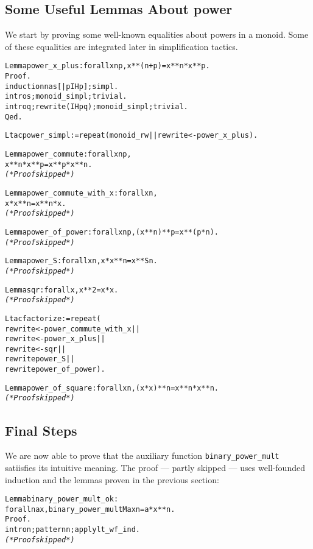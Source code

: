 \documentclass[a4]{report}
\begin{document}
\subsection{Some Useful Lemmas About power}

We start by proving some well-known equalities about powers in a monoid.
Some of these equalities are integrated later in simplification tactics. 

\begin{alltt}
  Lemma power_x_plus : forall x n p, x ** (n + p) =  x ** n *  x ** p.
  Proof.
    induction n as [| p IHp];simpl.
     intros; monoid_simpl;trivial.
    intro q;rewrite (IHp q);  monoid_simpl;trivial. 
  Qed.

  Ltac power_simpl := repeat (monoid_rw || rewrite <- power_x_plus).

  Lemma power_commute : forall x n p,  
               x ** n * x ** p = x ** p * x ** n. 
  {\it\color{red}(* Proof skipped *)}

  Lemma power_commute_with_x : forall x n ,  
        x * x ** n = x ** n * x.
  {\it\color{red} (* Proof skipped *)}                            
 
  Lemma power_of_power : forall x n p,  (x ** n) ** p = x ** (p * n).
  {\it\color{red} (* Proof skipped *) }     

  Lemma power_S : forall x n, x *  x ** n = x ** S n.
  {\it\color{red} (* Proof skipped *)} 

  Lemma sqr : forall x, x ** 2 =  x * x.
  {\it\color{red} (* Proof skipped *)}

  Ltac factorize := repeat (
                rewrite <- power_commute_with_x ||
                rewrite  <- power_x_plus  ||
                rewrite <- sqr ||
                rewrite power_S ||
                rewrite power_of_power).

  Lemma power_of_square : forall x n, (x * x) ** n = x ** n * x ** n.
  {\it\color{red}(* Proof skipped *)}
\end{alltt}

\subsection{Final Steps}
We are now able to prove that the auxiliary function \texttt{binary\_power\_mult}
satiisfies its intuitive meaning. The proof --- partly skipped --- uses well-founded induction and the lemmas proven in the previous section:

\begin{alltt}
  Lemma binary_power_mult_ok :
    forall n a x, binary_power_mult M a x n = a * x ** n.
  Proof.
    intro n; pattern n; apply lt_wf_ind.
    {\it\color{red}(* Proof skipped *)}
\end{alltt}
\end{document}

